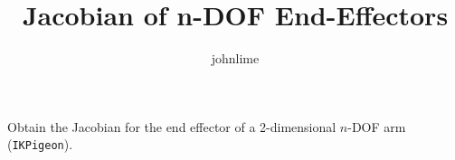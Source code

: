 \documentclass{article}
\newenvironment{problem}[2][Problem]{\begin{trivlist}
\item[\hskip \labelsep {\bfseries #1}\hskip \labelsep {\bfseries #2.}]}{\end{trivlist}}
\begin{document}

\title{Jacobian of n-DOF End-Effectors} %
\author{johnlime} %

\maketitle

%

\begin{problem}{}
  Obtain the Jacobian for the end effector of a 2-dimensional $n$-DOF arm (\verb|IKPigeon|).
\end{problem}
\end{document}
